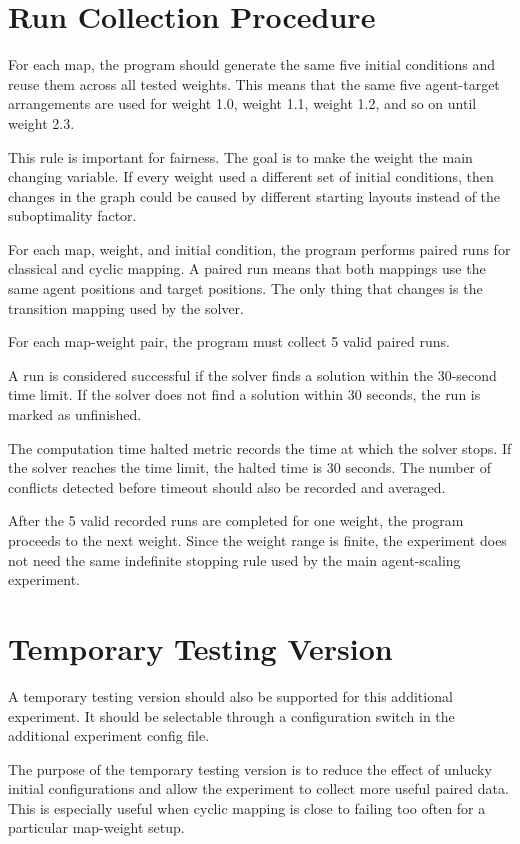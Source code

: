\documentclass[11pt,a4paper]{article}
\begin{document}
\section*{Run Collection Procedure}

For each map, the program should generate the same five initial conditions and reuse them across all tested weights. This means that the same five agent-target arrangements are used for weight 1.0, weight 1.1, weight 1.2, and so on until weight 2.3.

This rule is important for fairness. The goal is to make the weight the main changing variable. If every weight used a different set of initial conditions, then changes in the graph could be caused by different starting layouts instead of the suboptimality factor.

For each map, weight, and initial condition, the program performs paired runs for classical and cyclic mapping. A paired run means that both mappings use the same agent positions and target positions. The only thing that changes is the transition mapping used by the solver.

For each map-weight pair, the program must collect 5 valid paired runs.

A run is considered successful if the solver finds a solution within the 30-second time limit. If the solver does not find a solution within 30 seconds, the run is marked as unfinished.

The computation time halted metric records the time at which the solver stops. If the solver reaches the time limit, the halted time is 30 seconds. The number of conflicts detected before timeout should also be recorded and averaged.

After the 5 valid recorded runs are completed for one weight, the program proceeds to the next weight. Since the weight range is finite, the experiment does not need the same indefinite stopping rule used by the main agent-scaling experiment.

\section*{Temporary Testing Version}

A temporary testing version should also be supported for this additional experiment. It should be selectable through a configuration switch in the additional experiment config file.

The purpose of the temporary testing version is to reduce the effect of unlucky initial configurations and allow the experiment to collect more useful paired data. This is especially useful when cyclic mapping is close to failing too often for a particular map-weight setup.
\end{document}
